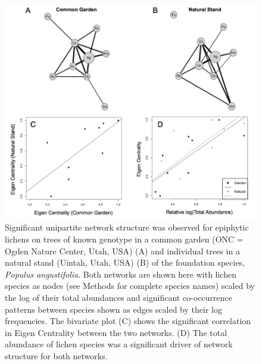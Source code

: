 \documentclass[fleqn,10pt]{wlscirep}
\begin{document}
\begin{figure}[ht]
\centering
\includegraphics[width=\linewidth]{fig1}
\caption{Significant unipartite network structure was observed for
  epiphytic lichens on trees of known genotype in a common garden (ONC
  = Ogden Nature Center, Utah, USA) (A) and individual trees in a
  natural stand (Uintah, Utah, USA) (B) of the foundation species,
  \textit{Populus angustifolia}. Both networks are shown here with
  lichen species as nodes (see Methods for complete species names)
  scaled by the log of their total abundances and significant
  co-occurrence patterns between species shown as edges scaled by
  their log frequencies. The bivariate plot (C) shows the significant
  correlation in Eigen Centrality between the two networks. (D) The
  total abundance of lichen species was a significant driver of
  network structure for both networks.}
\label{fig:fig1}
\end{figure}
\end{document}
